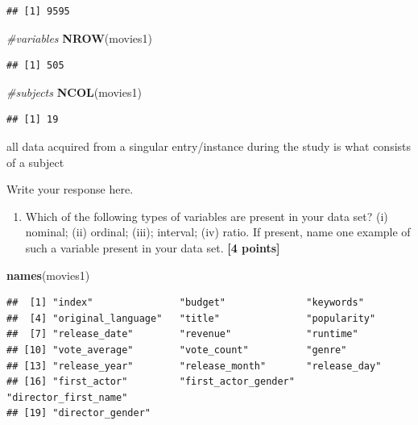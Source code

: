 \documentclass[
]{article}
\newenvironment{Shaded}{\begin{snugshade}}{\end{snugshade}}
\newcommand{\CommentTok}[1]{\textcolor[rgb]{0.56,0.35,0.01}{\textit{#1}}}
\newcommand{\FunctionTok}[1]{\textcolor[rgb]{0.13,0.29,0.53}{\textbf{#1}}}
\newcommand{\NormalTok}[1]{#1}
\providecommand{\tightlist}{%
  \setlength{\itemsep}{0pt}\setlength{\parskip}{0pt}}
\begin{document}
\begin{verbatim}
## [1] 9595
\end{verbatim}

\begin{Shaded}
\begin{Highlighting}[]
\CommentTok{\#variables}
\FunctionTok{NROW}\NormalTok{(movies1)}
\end{Highlighting}
\end{Shaded}

\begin{verbatim}
## [1] 505
\end{verbatim}

\begin{Shaded}
\begin{Highlighting}[]
\CommentTok{\#subjects}
\FunctionTok{NCOL}\NormalTok{(movies1)}
\end{Highlighting}
\end{Shaded}

\begin{verbatim}
## [1] 19
\end{verbatim}

all data acquired from a singular entry/instance during the study is
what consists of a subject

Write your response here.

\begin{enumerate}
\def\labelenumi{\arabic{enumi}.}
\setcounter{enumi}{1}
\tightlist
\item
  Which of the following types of variables are present in your data
  set? (i) nominal; (ii) ordinal; (iii); interval; (iv) ratio. If
  present, name one example of such a variable present in your data set.
  \textbf{[4 points]}
\end{enumerate}

\begin{Shaded}
\begin{Highlighting}[]
\FunctionTok{names}\NormalTok{(movies1)}
\end{Highlighting}
\end{Shaded}

\begin{verbatim}
##  [1] "index"               "budget"              "keywords"           
##  [4] "original_language"   "title"               "popularity"         
##  [7] "release_date"        "revenue"             "runtime"            
## [10] "vote_average"        "vote_count"          "genre"              
## [13] "release_year"        "release_month"       "release_day"        
## [16] "first_actor"         "first_actor_gender"  "director_first_name"
## [19] "director_gender"
\end{verbatim}
\end{document}
